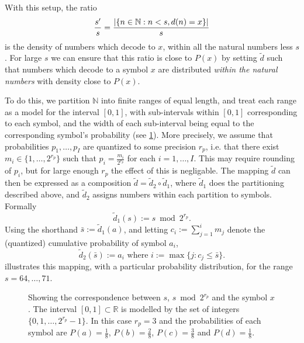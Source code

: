 \documentclass{article}
\DeclarePairedDelimiter\abs{\lvert}{\rvert}
\begin{document}
With this setup, the ratio
\begin{equation}\label{eq:ratio}
  \frac{s'}{s} = \frac{\abs{\{n\in\mathbb{N}: n < s, d(n) = x\}}}{s}
\end{equation}
is the density of numbers which decode to $x$, within all the natural numbers
less $s$. For large $s$ we can ensure that this ratio is close to $P(x)$ by
setting $\tilde d$ such that numbers which decode to a symbol $x$ are
distributed \emph{within the natural numbers} with density close to $P(x)$.

To do this, we partition $\mathbb{N}$ into finite ranges of equal length, and
treat each range as a model for the interval $[0, 1]$, with sub-intervals
within $[0, 1]$ corresponding to each symbol, and the width of each
sub-interval being equal to the corresponding symbol's probability (see
\cref{fig:interval}).  More precisely, we assume that probabilities $p_1,
\ldots, p_I$ are quantized to some precision $r_p$, i.e.  that there exist
$m_i\in\{1,\ldots,2^{r_p}\}$ such that $p_i = \frac{m_i}{2^{r_p}}$ for each
$i=1,\ldots,I$. This may require rounding of $p_i$, but for large enough $r_p$
the effect of this is negligable. The mapping $\tilde d$ can then be expressed
as a composition $\tilde d = \tilde d_2 \circ \tilde d_1$, where $\tilde d_1$
does the partitioning described above, and $\tilde d_2$ assigns numbers within
each partition to symbols. Formally
\begin{equation}
  \tilde d_1(s) := s \bmod 2^{r_p}.
\end{equation}
Using the shorthand $\bar{s} := \tilde d_1 (a)$, and letting $c_i :=
\sum_{j=1}^i m_j$ denote the (quantized) cumulative probability of symbol
$a_i$,
\begin{equation}
  \tilde d_2(\bar s) := a_i\text{ where }i := \max \{j : c_j \leq \bar s\}.
\end{equation}
 illustrates this mapping, with a particular probability
distribution, for the range $s = 64,\ldots, 71$.

\begin{figure}[h]
  \centering
  \drawinterval
  \caption{
    Showing the correspondence between $s$, $s \bmod 2^{r_p}$ and the symbol
    $x$. The interval $[0, 1]\subset\mathbb{R}$ is modelled by the set of
    integers $\{0, 1, \ldots, 2^{r_p} - 1\}$. In this case $r_p = 3$ and the
    probabilities of each symbol are $P(a) = \frac{1}{8}$, $P(b) =
    \frac{2}{8}$, $P(c) = \frac{3}{8}$ and $P(d) = \frac{1}{8}$.}
  \label{fig:interval}
\end{figure}
\end{document}
